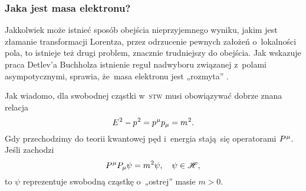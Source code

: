\documentclass[10pt,t]{beamer}
\begin{document}
\begin{frame}
  \frametitle{Jaka jest masa elektronu?}


  Jakkolwiek może istnieć sposób obejścia nieprzyjemnego wyniku, jakim jest
  złamanie transformacji Lorentza, przez odrzucenie pewnych założeń
  o~lokalności pola, to istnieje też drugi
  problem, znacznie trudniejszy do obejścia. Jak wskazuje praca Detlev’a
  Buchholza istnienie reguł nadwyboru związanej z~polami asympotycznymi,
  sprawia, że~masa elektronu jest „rozmyta”
  \parencite{Buchholz-The-Physical-State-Space-Of-Quantum-ETC-Pub-1982}.

  Jak wiadomo, dla swobodnej cząstki w~\textsc{stw} musi obowiązywać
  dobrze znana relacja
  \begin{equation}
    \label{eq:Glowne-rodzaje-problemow-podczerwonych-12}
    E^{ \hspace{0.05em} 2 } - p^{ \hspace{0.05em} 2 } =
    p^{ \hspace{0.05em} \mu } p_{ \mu }  = m^{ \hspace{0.05em} 2 }.
  \end{equation}
  Gdy przechodzimy do teorii kwantowej pęd i~energia stają~się operatorami
  $P^{ \hspace{0.05em} \mu }$. Jeśli zachodzi
  \begin{equation}
    \label{eq:Glowne-rodzaje-problemow-podczerwonych-13}
    P^{ \hspace{0.05em} \mu } P_{ \mu } \psi  = m^{ \hspace{0.05em} 2 } \psi, \quad
    \psi \in \mathcal{H},
  \end{equation}
  to $\psi$ reprezentuje swobodną cząstkę o~„ostrej” masie $m > 0$.%


\end{frame}
\end{document}
